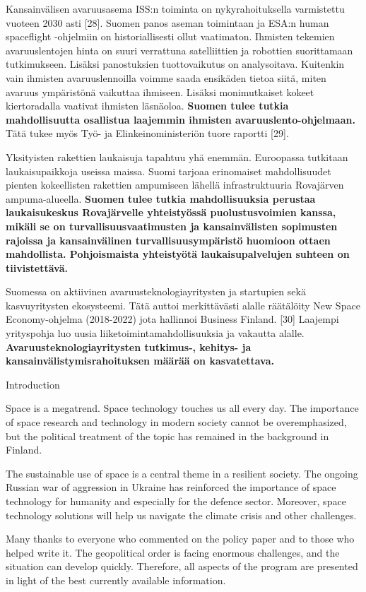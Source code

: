 Kansainvälisen avaruusasema ISS:n toiminta on nykyrahoituksella
varmistettu vuoteen 2030 asti {[}28{]}. Suomen panos aseman toimintaan
ja ESA:n human spaceflight -ohjelmiin on historiallisesti ollut
vaatimaton. Ihmisten tekemien avaruuslentojen hinta on suuri verrattuna
satelliittien ja robottien suorittamaan tutkimukseen. Lisäksi
panostuksien tuottovaikutus on analysoitava. Kuitenkin vain ihmisten
avaruuslennoilla voimme saada ensikäden tietoa siitä, miten avaruus
ympäristönä vaikuttaa ihmiseen. Lisäksi monimutkaiset kokeet
kiertoradalla vaativat ihmisten läsnäoloa. \textbf{Suomen tulee tutkia
mahdollisuutta osallistua laajemmin ihmisten avaruuslento-ohjelmaan.
}Tätä tukee myös Työ- ja Elinkeinoministeriön tuore raportti {[}29{]}.

Yksityisten rakettien laukaisuja tapahtuu yhä enemmän. Euroopassa
tutkitaan laukaisupaikkoja useissa maissa. Suomi tarjoaa erinomaiset
mahdollisuudet pienten kokeellisten rakettien ampumiseen lähellä
infrastruktuuria Rovajärven ampuma-alueella. \textbf{Suomen tulee tutkia
mahdollisuuksia perustaa laukaisukeskus Rovajärvelle yhteistyössä
puolustusvoimien kanssa, mikäli se on turvallisuusvaatimusten ja
kansainvälisten sopimusten rajoissa ja kansainvälinen
turvallisuusympäristö huomioon ottaen mahdollista. Pohjoismaista
yhteistyötä laukaisupalvelujen suhteen on tiivistettävä.}

Suomessa on aktiivinen avaruusteknologiayritysten ja startupien sekä
kasvuyritysten ekosysteemi. Tätä auttoi merkittävästi alalle räätälöity
New Space Economy-ohjelma (2018-2022) jota hallinnoi Business Finland.
{[}30{]} Laajempi yrityspohja luo uusia liiketoimintamahdollisuuksia ja
vakautta alalle. \textbf{Avaruusteknologiayritysten tutkimus-, kehitys-
ja kansainvälistymisrahoituksen määrää on kasvatettava.}

\protect\hypertarget{anchor-6}{}{}Introduction

Space is a megatrend. Space technology touches us all every day. The
importance of space research and technology in modern society cannot be
overemphasized, but the political treatment of the topic has remained in
the background in Finland.

The sustainable use of space is a central theme in a resilient society.
The ongoing Russian war of aggression in Ukraine has reinforced the
importance of space technology for humanity and especially for the
defence sector. Moreover, space technology solutions will help us
navigate the climate crisis and other challenges.

Many thanks to everyone who commented on the policy paper and to those
who helped write it. The geopolitical order is facing enormous
challenges, and the situation can develop quickly. Therefore, all
aspects of the program are presented in light of the best currently
available information.

